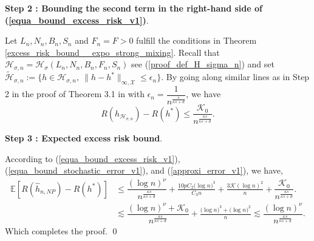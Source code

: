 \documentclass[10pt,twoside]{article}
\numberwithin{equation}{section}
\newcommand{\E}{\ensuremath{\mathbb{E}}}
\newcommand{\mk}{ { \mathcal{K}} }
\newcommand{\mx}{ { \mathcal{X}} }
\begin{document}
\medskip

\noindent
\textbf{Step 2 : Bounding the second term in the right-hand side of (\ref{equa_bound_excess_risk_v1})}. 

\medskip

\noindent
Let $L_n, N_n, B_n, S_n$ and $F_n = F > 0$ fulfill the conditions in Theorem \ref{excess_risk_bound__expo_strong_mixing}.
%
Recall that $\mathcal{H}_{\sigma, n} = \mathcal{H}_{\sigma}(L_n, N_n, B_n, F_n, S_n)$ see (\ref{proof_def_H_sigma_n})
%
and set
%
$ \widetilde{\mathcal{H}}_{\sigma, n} := \{h \in  \mathcal{H}_{\sigma,n}, ~ \|h - h^*\|_{\infty, \mx}  \leq \epsilon_n\} $.
%
%
By going along similar lines as in Step 2 in the proof of Theorem 3.1 in \cite{kengne2025general} with $\epsilon_n = \dfrac{ 1}{ n^{\frac{s}{\kappa s + d}} }$, we have
%
%
\begin{equation}\label{approxi_error_v1}
R(h_{\mathcal{H}_{\sigma, n}}) - R(h^{*})
\leq \dfrac{ \mk_0}{n^{\frac{\kappa s}{\kappa s + d}} } .
\end{equation}
%
 
\medskip

\noindent
\textbf{Step 3 : Expected excess risk bound}.
\medskip

\noindent
According to (\ref{equa_bound_excess_risk_v1}), (\ref{equa_bound_stochastic_error_v1}), and (\ref{approxi_error_v1}), we have,
%
\begin{align*}
\E[R(\widehat{h}_{n,NP}) - R(h^{*})]  
& \leq  \dfrac{(\log n)^{\nu}}{ n^{\frac{\kappa s}{\kappa s + d} } } + \frac{10 p C_2 \big(\log n\big)^3}{C_3 n}  + \frac{3\mathcal{K}(\log n)^2}{n} + \dfrac{ \mk_0}{n^{\frac{\kappa s}{\kappa s + d}} }.
\\
%
& \lesssim \dfrac{(\log n)^{\nu} + \mk_0}{ n^{\frac{\kappa s}{\kappa s + d} } } +  \frac{ \big(\log n\big)^3 + \big(\log n\big)^2}{n} \lesssim \dfrac{(\log n)^{\nu} }{ n^{\frac{\kappa s}{\kappa s + d} } } .
\end{align*}
%
%
Which completes the proof.
\qed
\end{document}
